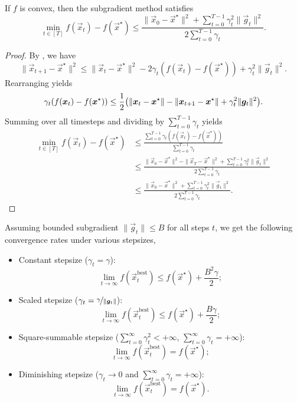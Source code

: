 \begin{theorem}
    If $f$ is convex, then the subgradient method satisfies \[
        \min_{t \in [T]} f(\vec{x}_t) - f(\vec{x}^\star) \leq \frac{\| \vec{x}_0 - \vec{x}^\star \|^2 + \sum_{t=0}^{T-1} \gamma_t^2 \| \vec{g}_t \|^2}{2 \sum_{t=0}^{T-1} \gamma_t}.
    \]
\end{theorem}

\begin{proof}
    By , we have \[
        \| \vec{x}_{t+1} - \vec{x}^\star \|^2 \leq \| \vec{x}_t - \vec{x}^\star \|^2 - 2 \gamma_t (f(\vec{x}_t) - f(\vec{x}^\star)) + \gamma_t^2 \| \vec{g}_t \|^2.
    \]
    Rearranging yields \[
        \gamma_t (f(\vec{x}_t) - f(\vec{x}^\star)) \leq \frac{1}{2} \lft( \| \vec{x}_t - \vec{x}^\star \| - \| \vec{x}_{t+1} - \vec{x}^\star \| + \gamma_t^2 \| \vec{g}_t \|^2 \rgt).
    \]
    Summing over all timesteps and dividing by $\sum_{t=0}^{T-1} \gamma_t$ yields
    \begin{align*}
        \min_{t \in [T]} f(\vec{x}_t) - f(\vec{x}^\star) & \leq \frac{\sum_{t=0}^{T-1} \gamma_t (f(\vec{x}_t) - f(\vec{x}^\star))}{\sum_{t=0}^{T-1} \gamma_t}                                                             \\
                                                         & \leq \frac{\| \vec{x}_0 - \vec{x}^\star \|^2 - \| \vec{x}_T - \vec{x}^\star \|^2 + \sum_{t=0}^{T-1} \gamma_t^2 \| \vec{g}_t \|^2}{2 \sum_{t=0}^{T-1} \gamma_t} \\
                                                         & \leq \frac{\| \vec{x}_0 - \vec{x}^\star \|^2 + \sum_{t=0}^{T-1} \gamma_t^2 \| \vec{g}_t \|^2}{2 \sum_{t=0}^{T-1} \gamma_t}.
    \end{align*}
\end{proof}

Assuming bounded subgradient $\| \vec{g}_t \| \leq B$ for all steps $t$, we get the following
convergence rates under various stepsizes,
\begin{itemize}
    \item Constant stepsize ($\gamma_t = \gamma$): \[
              \lim_{t\to \infty} f(\vec{x}_t^{\mathrm{best}}) \leq f(\vec{x}^\star) + \frac{B^2 \gamma}{2};
          \]
    \item Scaled stepsize ($\gamma_t = \nicefrac{\gamma}{\| \vec{g}_t \|}$): \[
              \lim_{t \to \infty} f(\vec{x}_t^{\mathrm{best}}) \leq f(\vec{x}^\star) + \frac{B \gamma}{2};
          \]
    \item Square-summable stepsize ($\sum_{t=0}^{\infty} \gamma_t^2 < +\infty$, $\sum_{t=0}^{\infty} \gamma_t
              = +\infty$): \[
              \lim_{t \to \infty} f(\vec{x}_t^{\mathrm{best}}) = f(\vec{x}^\star);
          \]
    \item Diminishing stepsize ($\gamma_t \to 0$ and $\sum_{t=0}^{\infty} \gamma_t = +\infty$): \[
              \lim_{t \to \infty} f(\vec{x}_t^{\mathrm{best}}) = f(\vec{x}^\star).
          \]
\end{itemize}


